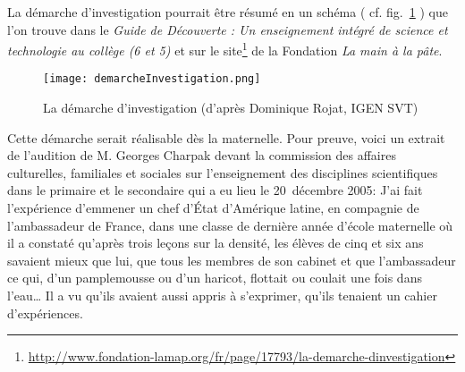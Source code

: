 La démarche d’investigation pourrait être résumé en un schéma (%
cf. fig.~\ref{demarcheInvestigation}%
) que l’on trouve dans le \textit{Guide de Découverte : Un enseignement intégré de science et technologie au collège (6\ieme{} et 5\ieme)} \cite[p.~65]{Lena2011} et sur le site\footnote{\url{http://www.fondation-lamap.org/fr/page/17793/la-demarche-dinvestigation}} de la Fondation \textit{La main à la pâte}.
\begin{figure}[h!tbp]
  \centering
  \texttt{[image: demarcheInvestigation.png]}
  \caption{La démarche d’investigation (d’après Dominique Rojat, IGEN SVT)}
  \label{demarcheInvestigation}
\end{figure}
Cette démarche serait réalisable dès la maternelle. Pour preuve, voici un extrait de l’audition de M. Georges Charpak devant la commission des affaires culturelles, familiales et sociales sur l’enseignement des disciplines scientifiques dans le primaire et le secondaire qui a eu lieu le 20~décembre 2005:
J’ai fait l’expérience d’emmener un chef d’État d’Amérique latine, en compagnie de l’ambassadeur de France, dans une classe de dernière année d’école maternelle où il a constaté qu’après trois leçons sur la densité, les élèves de cinq et six ans savaient mieux que lui, que tous les membres de son cabinet et que l’ambassadeur ce qui, d’un pamplemousse ou d’un haricot, flottait ou coulait une fois dans l’eau\dots{} Il a vu qu’ils avaient aussi appris à s’exprimer, qu’ils tenaient un cahier d’expériences. \cite[p.~157]{Rolland2006}

